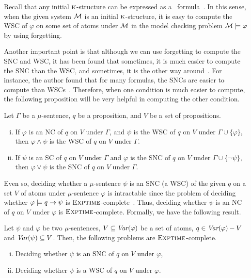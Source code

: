 \documentclass[runningheads]{llncs}
\begin{document}
Recall that any initial $\textsc{k}$-structure  can be expressed as a \CTL\ formula~\cite{renyansfirstpaper}.
In this sense, when the given system ${\cal M}$ is an initial $\textsc{k}$-structure, it is easy to compute the WSC of $\varphi$ on some set of atoms under ${\cal M}$ in the model checking problem ${\cal M} \models \varphi$ by using forgetting.

Another important point is that although we can use forgetting to compute the SNC and WSC, it has been found that sometimes, it is much easier
to compute the SNC than the WSC, and
sometimes, it is the other way around~\cite{DBLP:Lin:AIJ:2001}. For instance, the author found that for many
formulas, the SNCs are easier to compute than WSCs~\cite{DBLP:Lin:AIJ:2001}. Therefore, when one condition is much easier to compute, the following proposition will
be very helpful in computing the other condition.

\begin{proposition}\label{pro:eachOne}
Let $\Gamma$ be a $\mu$-sentence, $q$ be a proposition, and $V$ be a set of propositions.
\begin{enumerate}[(i)]
 \item If $\varphi$ is an NC of $q$ on $V$ under $\Gamma$, and $\psi$ is the WSC of $q$ on $V$ under $\Gamma \cup \{\varphi\}$, then $\varphi \wedge \psi$ is the WSC of $q$ on $V$ under $\Gamma$.
 \item  If $\psi$ is an SC of $q$ on $V$ under $\Gamma$ and $\varphi$ is the SNC of $q$ on $V$ under $\Gamma \cup \{\neg \psi\}$, then $\varphi \vee \psi$ is the SNC of $q$ on $V$ under $\Gamma$.
 \end{enumerate}
\end{proposition}



Even so,  deciding whether a $\mu$-sentence $\psi$ is an SNC (a WSC) of the given $q$ on a set $V$ of atoms under $\mu$-sentence $\varphi$ is intractable since the problem of deciding whether $\varphi \models q \rightarrow \psi$ is $\textsc{Exptime}$-complete~\cite{bradfield2018mu}.
Thus, deciding whether $\psi$ is an NC of $q$ on $V$ under $\varphi$ is $\textsc{Exptime}$-complete.
Formally, we have the following result.
\begin{theorem}\label{thm:exp:snc}
Let $\psi$ and $\varphi$ be two $\mu$-sentences, $V\subseteq \textit{Var}(\varphi)$ be a set of atoms, $q \in \textit{Var}(\varphi) - V$ and $\textit{Var}(\psi) \subseteq V$. Then, the following problems are $\textsc{Exptime}$-complete.
\begin{enumerate}[(i)]
    \item Deciding whether $\psi$ is an SNC of $q$ on $V$ under $\varphi$,
    \item Deciding whether $\psi$ is a WSC of $q$ on $V$ under $\varphi$.
\end{enumerate}
\end{theorem}
\end{document}
